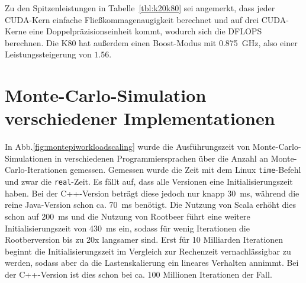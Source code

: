 Zu den Spitzenleistungen in Tabelle~\ref{tbl:k20k80} sei angemerkt, dass jeder CUDA-Kern einfache Fließkommagenaugigkeit berechnet und auf drei CUDA-Kerne eine Doppelpräzisionseinheit kommt, wodurch sich die DFLOPS berechnen.
Die K80 hat außerdem einen Boost-Modus mit \SI{0.875}{\giga\hertz}, also einer Leistungssteigerung von $1.56$.

\section{Monte-Carlo-Simulation verschiedener Implementationen}

In Abb.\ref{fig:montepiworkloadscaling} wurde die Ausführungszeit von Monte-Carlo-Simulationen in verschiedenen Programmiersprachen über die Anzahl an Monte-Carlo-Iterationen gemessen. Gemessen wurde die Zeit mit dem Linux \texttt{time}-Befehl und zwar die \texttt{real}-Zeit. Es fällt auf, dass alle Versionen eine Initialisierungszeit haben. Bei der C++-Version beträgt diese jedoch nur knapp \SI{30}{\milli\second}, während die reine Java-Version schon ca. \SI{70}{\milli\second} benötigt. Die Nutzung von Scala erhöht dies schon auf \SI{200}{\milli\second} und die Nutzung von Rootbeer führt eine weitere Initialisierungszeit von \SI{430}{\milli\second} ein, sodass für wenig Iterationen die Rootberversion bis zu 20x langsamer sind. Erst für 10 Milliarden Iterationen beginnt die Initialisierungszeit im Vergleich zur Rechenzeit vernachlässigbar zu werden, sodass aber da die Lastenskalierung ein lineares Verhalten annimmt. Bei der C++-Version ist dies schon bei ca. 100 Millionen Iterationen der Fall.
